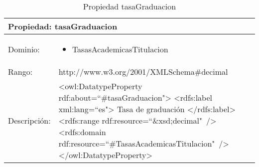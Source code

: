 \begin{table}[!ht]
	\centering
	\begin{tabular}{|p{}|p{}|}
		\hline
		\multicolumn{2}{|l|}{Propiedad: \textbf{tasaGraduacion}}
		\\ \hline
		Dominio:&
		\begin{itemize}
			\item TasasAcademicasTitulacion
		\end{itemize}
		\\ \hline
		Rango:&
		http://www.w3.org/2001/XMLSchema\#decimal
		\\ \hline
		Descripción:&
		\textless owl:DatatypeProperty rdf:about=``\#tasaGraduacion"\textgreater\newline 
		\tab\textless rdfs:label xml:lang=``es"\textgreater\newline
		\tab\tab Tasa de graduación\newline
		\tab\textless /rdfs:label\textgreater\newline
		\tab\textless rdfs:range\newline
		\tab\tab rdf:resource=``\&xsd;decimal"\ /\textgreater\newline
		\tab\textless rdfs:domain\newline
		\tab\tab rdf:resource=``\#TasasAcademicasTitulacion"\ /\textgreater\newline
		\textless /owl:DatatypeProperty\textgreater
		\\ \hline
	\end{tabular}
	\caption{Propiedad tasaGraduacion}
	\label{propiedad-tasagraduacion}
\end{table}

